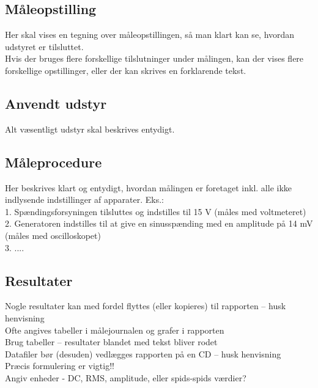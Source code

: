 \subsection*{Måleopstilling}
\label{maaleforforstaerker_maaleopstilling}
Her skal vises en tegning over måleopstillingen, så man klart kan se, hvordan udstyret er tilsluttet.\\
Hvis der bruges flere forskellige tilslutninger under målingen, kan der vises flere forskellige opstillinger, eller der kan skrives en forklarende tekst.\\

\subsection*{Anvendt udstyr}
\label{maaleforforstaerker_anvendtudstyr}
Alt væsentligt udstyr skal beskrives entydigt.\\

\subsection*{Måleprocedure}
\label{maaleforforstaerker_maaleprocedure}
Her beskrives klart og entydigt, hvordan målingen er foretaget inkl. alle ikke indlysende indstillinger af apparater. Eks.: \\
1. Spændingsforsyningen tilsluttes og indstilles til 15 V (måles med voltmeteret) \\
2. Generatoren indstilles til at give en sinusspænding med en amplitude på 14 mV (måles med oscilloskopet) \\
3. ....\\

\subsection*{Resultater}
\label{maaleforforstaerker_resultater}
Nogle resultater kan med fordel flyttes (eller kopieres) til rapporten – husk henvisning \\
Ofte angives tabeller i målejournalen og grafer i rapporten \\
Brug tabeller – resultater blandet med tekst bliver rodet\\
Datafiler bør (desuden) vedlægges rapporten på en CD – husk henvisning\\
Præcis formulering er vigtig!!\\
Angiv enheder - DC, RMS, amplitude, eller spids-spids værdier?\\

